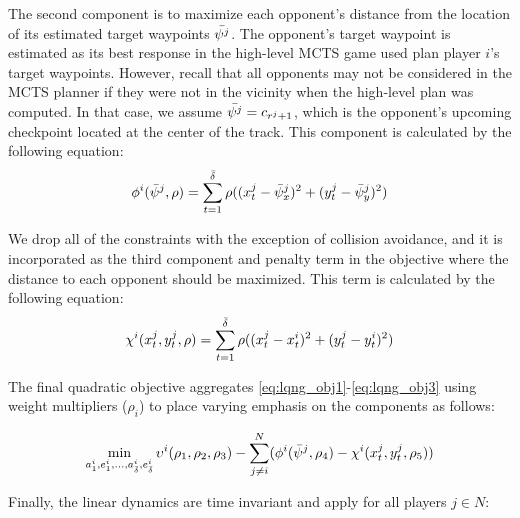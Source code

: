The second component is to maximize each opponent's distance from the location of its estimated target waypoints $\Bar{\psi^j}$. The opponent's target waypoint is estimated as its best response in the high-level MCTS game used plan player $i$'s target waypoints. However, recall that all opponents may not be considered in the MCTS planner if they were not in the vicinity when the high-level plan was computed. In that case, we assume $\Bar{\psi^j} = c_{r^j + 1}$, which is the opponent's upcoming checkpoint located at the center of the track. This component is calculated by the following equation:
\begin{equation} \label{eq:lqng_obj2}
    \phi^i(\Bar{\psi}^j, \rho) = \sum_{t = 1}^{\Bar{\delta}} \rho((x^j_{t} - \Bar{\psi}^j_x)^2 + (y^j_{t} - \Bar{\psi}^j_y)^2)
\end{equation}

We drop all of the constraints with the exception of collision avoidance, and it is incorporated as the third component and penalty term in the objective where the distance to each opponent should be maximized. This term is calculated by the following equation:
\begin{equation} \label{eq:lqng_obj3}
    \chi^i(x^j_t, y^j_t, \rho) = \sum_{t = 1}^{\Bar{\delta}} \rho((x^j_{t} - x^i_{t})^2 + (y^j_{t} - y^i_{t})^2)
\end{equation}

The final quadratic objective aggregates \eqref{eq:lqng_obj1}-\eqref{eq:lqng_obj3} using weight multipliers ($\rho_i$) to place varying emphasis on the components as follows:

\begin{equation} \label{eq:lqng_obj}
    \min_{a^i_{1}, e^i_{1}, ..., a^i_{\Bar{\delta}}, e^i_{\Bar{\delta}}}
    \upsilon^i(\rho_1, \rho_2,\rho_3)
    -\sum_{j \neq i}^{N}  (\phi^i(\Bar{\psi}^j, \rho_4) - \chi^i(x^j_t, y^j_t, \rho_5))
\end{equation}

Finally, the linear dynamics are time invariant and apply for all players $j \in N$:

